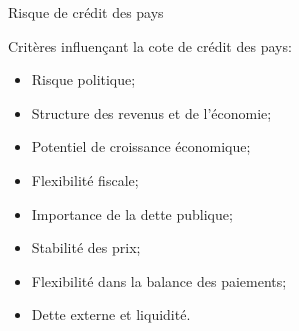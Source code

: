 \documentclass{beamer}
\begin{document}
\begin{frame}{Risque de crédit des pays}
\begin{block}{Critères influençant la cote de crédit des pays:}
\begin{itemize}
\item Risque politique;
\item Structure des revenus et de l’économie;
\item Potentiel de croissance économique;
\item Flexibilité fiscale;
\item Importance de la dette publique;
\item Stabilité des prix;
\item Flexibilité dans la balance des paiements;
\item Dette externe et liquidité.
\end{itemize}
\end{block}
\end{frame}
\end{document}

